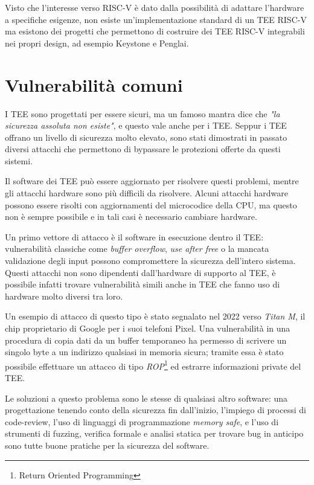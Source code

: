 \documentclass[12pt,italian]{report}
\begin{document}
Visto che l'interesse verso RISC-V è dato dalla possibilità di adattare
l'hardware a specifiche esigenze, non esiste un'implementazione standard
di un TEE RISC-V ma esistono dei progetti che permettono di costruire
dei TEE RISC-V integrabili nei propri design,
ad esempio Keystone\cite{keystone} e Penglai\cite{penglai}.

\section{Vulnerabilità comuni}
\label{sec:vulnerabilita-comuni}
I TEE sono progettati per essere sicuri, ma un famoso mantra dice che
\textit{"la sicurezza assoluta non esiste"}, e questo vale anche per i TEE.
Seppur i TEE offrano un livello di sicurezza molto elevato, sono stati
dimostrati in passato diversi attacchi che permettono di bypassare
le protezioni offerte da questi sistemi.

Il software dei TEE può essere aggiornato per risolvere questi problemi,
mentre gli attacchi hardware sono più difficili da risolvere.
Alcuni attacchi hardware possono essere risolti con aggiornamenti del
microcodice della CPU, ma questo non è sempre possibile e in tali casi
è necessario cambiare hardware. 

\medbreak
Un primo vettore di attacco è il software in esecuzione dentro il TEE:
vulnerabilità classiche come \textit{buffer overflow}, \textit{use after free}
o la mancata validazione degli input possono compromettere la sicurezza
dell'intero sistema.
Questi attacchi non sono dipendenti dall'hardware di supporto al TEE,
è possibile infatti trovare vulnerabilità simili anche in TEE che fanno
uso di hardware molto diversi tra loro.

Un esempio di attacco di questo tipo è stato segnalato nel 2022 verso
\textit{Titan M}\cite{attack_titanM}, il chip proprietario di Google
per i suoi telefoni Pixel.
Una vulnerabilità in una procedura di copia dati da un buffer temporaneo
ha permesso di scrivere un singolo byte a un indirizzo qualsiasi in memoria
sicura; tramite essa è stato possibile effettuare un attacco
di tipo \textit{ROP}\footnote{Return Oriented Programming}
ed estrarre informazioni private del TEE.

Le soluzioni a questo problema sono le stesse di qualsiasi altro software:
una progettazione tenendo conto della sicurezza fin dall'inizio, 
l'impiego di processi di code-review, l'uso di linguaggi di programmazione
\textit{memory safe}, e l'uso di strumenti di fuzzing, verifica formale e
analisi statica per trovare bug in anticipo sono tutte buone pratiche per
la sicurezza del software.  
\end{document}
